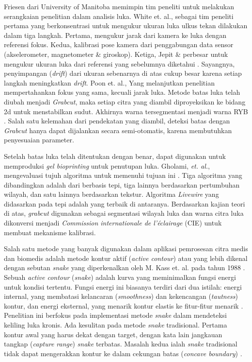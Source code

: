 Friesen dari University of Manitoba memimpin tim peneliti untuk melakukan serangkaian penelitian dalam analisis luka. White et. al., sebagai tim peneliti pertama yang berkonsentrasi untuk mengukur ukuran luka ulkus tekan dilakukan dalam tiga langkah. Pertama, mengukur jarak dari kamera ke luka dengan referensi fokus. Kedua, kalibrasi pose kamera dari penggabungan data sensor (akselerometer, magnetometer \& giroskop). Ketiga, Jepit \& perbesar untuk mengukur ukuran luka dari referensi yang sebelumnya diketahui \citep{white2014algorithms:16}. Sayangnya, penyimpangan (\emph{drift}) dari ukuran sebenarnya di atas cukup besar karena setiap langkah meningkatkan \emph{drift}. Poon et. al., Yang melanjutkan penelitian mempertahankan fokus yang sama, kecuali jarak luka. Metode batas luka telah diubah menjadi \emph{Grabcut}, maka setiap citra yang diambil diproyeksikan ke bidang 2d untuk menstabilkan sudut. Akhirnya warna tersegmentasi menjadi warna RYB \citep{poon2015algorithms:17}. Salah satu kelemahan dari pendekatan yang diambil, deteksi batas dengan \emph{Grabcut} hanya dapat dijalankan secara semi-otomatis, karena membutuhkan penyesuaian parameter. %

Setelah batas luka telah ditentukan dengan benar, dapat digunakan untuk memproduksi \emph{gel bioprinting} untuk penutupan luka. Gholami, \emph{et. al.}, mengevaluasi tujuh algoritma untuk memenuhi tujuan ini \citep{gholami2017segmentation:18}. Tiga algoritma yang dibandingkan adalah dari berbasis tepi, tiga lainnya berdasarkan pertumbuhan wilayah, dan satu lainnya berdasarkan tekstur. Algoritma \emph{Livewire} yang didasarkan pada tepi adalah yang terbaik di antaranya. Berdasarkan kajian teori di atas, \emph{grabcut} digunakan sebagai segmentasi wilayah luka dan warna citra luka dikonversi menjadi \emph{Commission internationale de l'éclairage} (CIE) untuk membuat mekanisme kalibrasi. %

Salah satu metode yang banyak digunakan dalam aplikasi pemrosesan citra medis dan biomedis adalah metode kontur aktif (\emph{active contour}) atau yang lebih dikenal dengan sebutan \emph{snake} yang diperkenalkan oleh M. Kass et. al. pada tahun 1988 \citep{kass1988snakes:21}. Sebuah \emph{active contour} (\emph{snake}) adalah kurva yang meminimalkan fungsi energi untuk kondisi tertentu. Fungsi energi ini biasanya terdiri dari dua istilah: energi internal, yang membatasi kelancaran (\emph{smoothness}) dan kekencangan (\emph{tautness}) kontur, dan energi eksternal, yang menarik kontur elastis ke fitur-fitur menarik \citep{acton2007biomedical:19}. Penelitian ini berfokus pada implementasi metode \emph{snake} dalam mendeteksi keliling luka kronis. %
Ada kesulitan pada metode \emph{snake} tradisional. Pertama kontur awal yang harus dekat dengan target, dengan kata lain jangkauan tangkap (\emph{capture range}) \emph{snake} terbatas. Masalah kedua ialah \emph{snake} tradisional tidak dapat mengerakkan kontur ke dalam cekungan batas (\emph{concave boundary}) \citep{guo2013review:20} \citep{xu1998snakes:22}. 

